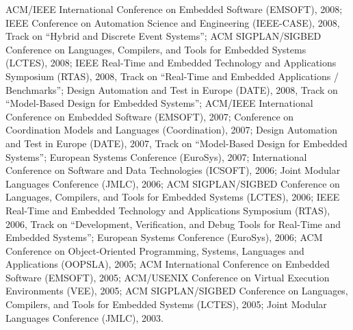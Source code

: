 {\begin{itemize}
ACM/IEEE International Conference on Embedded Software (EMSOFT), 2008;
IEEE Conference on Automation Science and Engineering (IEEE-CASE), 2008, Track on ``Hybrid and Discrete Event
Systems'';
ACM SIGPLAN/SIGBED Conference on Languages, Compilers, and Tools for Embedded Systems (LCTES), 2008;
IEEE Real-Time and Embedded Technology and Applications Symposium (RTAS), 2008, Track on ``Real-Time and Embedded Applications / Benchmarks'';
Design Automation and Test in Europe (DATE), 2008, Track on ``Model-Based Design for Embedded Systems'';
ACM/IEEE International Conference on Embedded Software (EMSOFT), 2007;
Conference on Coordination Models and Languages (Coordination), 2007;
Design Automation and Test in Europe (DATE), 2007, Track on ``Model-Based Design for Embedded Systems'';
European Systems Conference (EuroSys), 2007;
International Conference on Software and Data Technologies (ICSOFT), 2006;
Joint Modular Languages Conference (JMLC), 2006;
ACM SIGPLAN/SIGBED Conference on Languages, Compilers, and Tools for Embedded Systems (LCTES), 2006;
IEEE Real-Time and Embedded Technology and Applications Symposium (RTAS), 2006, Track on ``Development, Verification, and Debug Tools for Real-Time and Embedded Systems'';
European Systems Conference (EuroSys), 2006;
ACM Conference on Object-Oriented Programming, Systems, Languages and Applications (OOPSLA), 2005;
ACM International Conference on Embedded Software (EMSOFT), 2005;
ACM/USENIX Conference on Virtual Execution Environments (VEE), 2005;
ACM SIGPLAN/SIGBED Conference on Languages, Compilers, and Tools for Embedded Systems (LCTES), 2005;
Joint Modular Languages Conference (JMLC), 2003.
\end{itemize}
}



